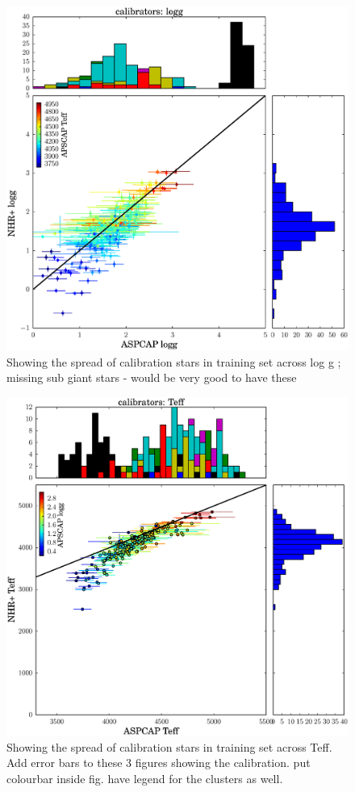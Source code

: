 \documentclass[12pt, preprint]{aastex}
\begin{document}
\begin{figure}[h!]
  \includegraphics[width=\hsize]{./plots/cal_logg.eps}
\caption{Showing the spread of calibration stars in training set across log g ; missing sub giant stars - would be very good to have these }
\label{fig:cal_g}
\end{figure}

\begin{figure}[h!]
  \includegraphics[width=\hsize]{./plots/cal_teff.eps}
\caption{Showing the spread of calibration stars in training set across Teff. Add error bars to these 3 figures showing the calibration.  put colourbar inside fig. have legend for the clusters as well.  }
\label{fig:cal_teff}
\end{figure}
\end{document}
